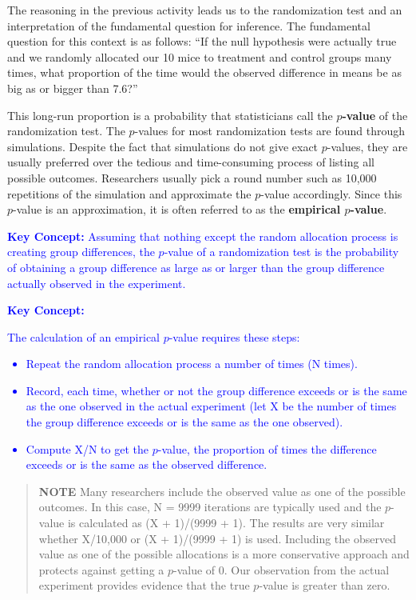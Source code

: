 \documentclass[
]{book}
\begin{document}
The reasoning in the previous activity leads us to the randomization test and an interpretation of the fundamental question for inference. The fundamental question for this context is as follows: ``If the null hypothesis were actually true and we randomly allocated our 10 mice to treatment and control groups many times, what proportion of the time would the observed difference in means be as big as or bigger than 7.6?''

This long-run proportion is a probability that statisticians call the \textbf{\(p\)-value} of the randomization test. The \(p\)-values for most randomization tests are found through simulations. Despite the fact that simulations do not give exact \(p\)-values, they are usually preferred over the tedious and time-consuming process of listing all possible outcomes. Researchers usually pick a round number such as 10,000 repetitions of the simulation and approximate the \(p\)-value accordingly. Since this \(p\)-value is an approximation, it is often referred to as the \textbf{empirical \(p\)-value}.

\textbf{\textcolor{blue}{Key Concept:}}
\textcolor{blue}{Assuming that nothing except the random allocation process is creating group differences, the $p$-value of a randomization test is the probability of obtaining a group difference as large as or larger than the group difference actually observed in the experiment.}

\textbf{\textcolor{blue}{Key Concept:}}

\textcolor{blue}{The calculation of an empirical $p$-value requires these steps:
\begin{itemize}
\item Repeat the random allocation process a number of times (N times).
\item Record, each time, whether or not the group difference exceeds or is the same as the one observed in the actual experiment (let X be the number of times the group difference exceeds or is the same as the one observed).
\item Compute X/N to get the $p$-value, the proportion of times the difference exceeds or is the same as the observed difference.
\end{itemize}}

\begin{quote}
\textbf{NOTE} Many researchers include the observed value as one of the possible outcomes. In this case, N = 9999 iterations are typically used and the \(p\)-value is calculated as (X + 1)/(9999 + 1). The results are very similar whether X/10,000 or (X + 1)/(9999 + 1) is used. Including the observed value as one of the possible allocations is a more conservative approach and protects against getting a \(p\)-value of 0. Our observation from the actual experiment provides evidence that the true \(p\)-value is greater than zero.
\end{quote}
\end{document}
